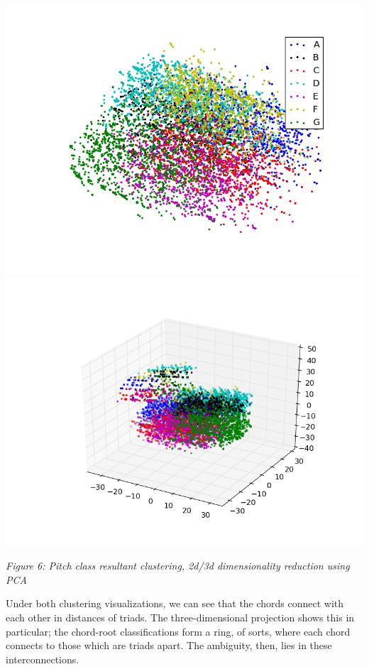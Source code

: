 \documentclass[12pt]{article}
\begin{document}
\includegraphics[trim = 70 40 0 00, scale=.85]{pcaFinal.png}\\
\includegraphics[trim = 70 40 0 35, scale=.85]{markov3d.png}
\begin{center}\emph{Figure 6: Pitch class resultant clustering, 2d/3d dimensionality reduction using PCA}\\ \end{center}

Under both clustering visualizations, we can see that the chords connect with each other in distances of triads. The three-dimensional projection shows this in particular; the chord-root classifications form a ring, of sorts, where each chord connects to those which are triads apart. The ambiguity, then, lies in these interconnections.\\
\end{document}
